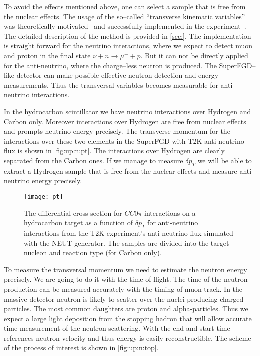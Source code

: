 \documentclass[main.tex]{subfiles}
\begin{document}
To avoid the effects mentioned above, one can select a sample that is free from the nuclear effects. The usage of the so--called ``transverse kinematic variables'' was theoretically motivated~\cite{Lu2016} and successfully implemented in the experiment~\cite{Abe2018d}. The detailed description of the method is provided in \autoref{sec:}. The implementation is straight forward for the neutrino interactions, where we expect to detect muon and proton in the final state $\nu+n\to\mu^-+p$. But it can not be directly applied for the anti-neutrino, where the charge--less neutron is produced. The SuperFGD--like detector can make possible effective neutron detection and energy measurements. Thus the transversal variables becomes measurable for anti-neutrino interactions.

In the hydrocarbon scintillator we have neutrino interactions over Hydrogen and Carbon only. Moreover interactions over Hydrogen are free from nuclear effects and prompts neutrino energy precisely. The transverse momentum for the interactions over these two elements in the SuperFGD with T2K anti-neutrino flux is shown in \autoref{fig:up:n:pt}. The interactions over Hydrogen are clearly separated from the Carbon ones. If we manage to measure $\delta p_T$ we will be able to extract a Hydrogen sample that is free from the nuclear effects and measure anti-neutrino energy precisely.

\begin{figure}[!ht]
	\centering
	\texttt{[image: pt]}
	\caption{The differential cross section for $CC0\pi$ interactions on a hydrocarbon target as a function of $\delta p_T$ for anti-neutrino interactions from the T2K experiment’s anti-neutrino flux simulated with the NEUT generator. The samples are divided into the target nucleon and reaction type (for Carbon only).}
	\label{fig:up:n:pt}
\end{figure}

To measure the transversal momentum we need to estimate the neutron energy precisely. We are going to do it with the time of flight. The time of the neutron production can be measured accurately with the timing of muon track. In the massive detector neutron is likely to scatter over the nuclei producing charged particles. The most common daughters are proton and alpha-particles. Thus we expect a large light deposition from the stopping hadron that will allow accurate time measurement of the neutron scattering. With the end and start time references neutron velocity and thus energy is easily reconstructible. The scheme of the process of interest is shown in \autoref{fig:up:n:top}.
\end{document}
